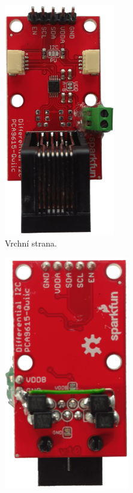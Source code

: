 \begin{figure}[H]
\centering
\begin{subfigure}{.5\textwidth}
    \centering
    \includegraphics[width=0.53\textwidth]{images/krb/modul-pca9615-i2c-sbernice.png}
    \caption{Vrchní strana.}
    \label{fig:modul-pca9615-i2c-sbernice}
\end{subfigure}%
\begin{subfigure}{.5\textwidth}
    \centering
    \includegraphics[width=0.6\textwidth]{images/krb/modul-pca9615-transily.png}

\end{subfigure}
\end{figure}
